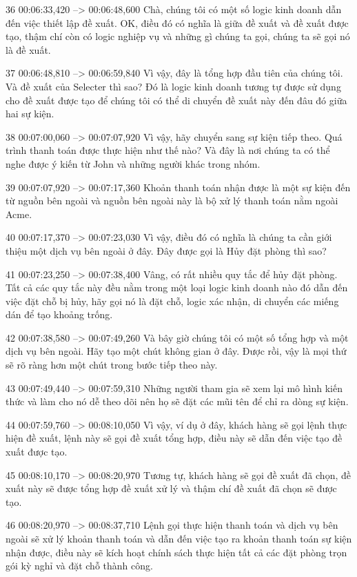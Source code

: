 36
00:06:33,420 --> 00:06:48,600
Chà, chúng tôi có một số logic kinh doanh dẫn đến việc thiết lập đề xuất.  OK, điều đó có nghĩa là giữa đề xuất và đề xuất được tạo, thậm chí còn có logic nghiệp vụ và những gì chúng ta gọi, chúng ta sẽ gọi nó là đề xuất.

37
00:06:48,810 --> 00:06:59,840
Vì vậy, đây là tổng hợp đầu tiên của chúng tôi.  Và đề xuất của Selecter thì sao?  Đó là logic kinh doanh tương tự được sử dụng cho đề xuất được tạo để chúng tôi có thể di chuyển đề xuất này đến đâu đó giữa hai sự kiện.

38
00:07:00,060 --> 00:07:07,920
Vì vậy, hãy chuyển sang sự kiện tiếp theo.  Quá trình thanh toán được thực hiện như thế nào?  Và đây là nơi chúng ta có thể nghe được ý kiến ​​từ John và những người khác trong nhóm.

39
00:07:07,920 --> 00:07:17,360
Khoản thanh toán nhận được là một sự kiện đến từ nguồn bên ngoài và nguồn bên ngoài này là bộ xử lý thanh toán nằm ngoài Acme.

40
00:07:17,370 --> 00:07:23,030
Vì vậy, điều đó có nghĩa là chúng ta cần giới thiệu một dịch vụ bên ngoài ở đây.  Đây được gọi là Hủy đặt phòng thì sao?

41
00:07:23,250 --> 00:07:38,400
Vâng, có rất nhiều quy tắc để hủy đặt phòng.  Tất cả các quy tắc này đều nằm trong một loại logic kinh doanh nào đó dẫn đến việc đặt chỗ bị hủy, hãy gọi nó là đặt chỗ, logic xác nhận, di chuyển các miếng dán để tạo khoảng trống.

42
00:07:38,580 --> 00:07:49,260
Và bây giờ chúng tôi có một số tổng hợp và một dịch vụ bên ngoài.  Hãy tạo một chút không gian ở đây.  Được rồi, vậy là mọi thứ sẽ rõ ràng hơn một chút trong bước tiếp theo này.

43
00:07:49,440 --> 00:07:59,310
Những người tham gia sẽ xem lại mô hình kiến ​​thức và làm cho nó dễ theo dõi nên họ sẽ đặt các mũi tên để chỉ ra dòng sự kiện.

44
00:07:59,760 --> 00:08:10,050
Vì vậy, ví dụ ở đây, khách hàng sẽ gọi lệnh thực hiện đề xuất, lệnh này sẽ gọi đề xuất tổng hợp, điều này sẽ dẫn đến việc tạo đề xuất được tạo.

45
00:08:10,170 --> 00:08:20,970
Tương tự, khách hàng sẽ gọi đề xuất đã chọn, đề xuất này sẽ được tổng hợp đề xuất xử lý và thậm chí đề xuất đã chọn sẽ được tạo.

46
00:08:20,970 --> 00:08:37,710
Lệnh gọi thực hiện thanh toán và dịch vụ bên ngoài sẽ xử lý khoản thanh toán và dẫn đến việc tạo ra khoản thanh toán sự kiện nhận được, điều này sẽ kích hoạt chính sách thực hiện tất cả các đặt phòng trọn gói kỳ nghỉ và đặt chỗ thành công.

